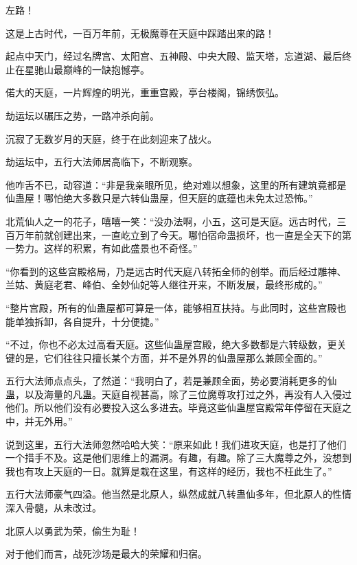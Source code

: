
\begin{this_body}

左路！

这是上古时代，一百万年前，无极魔尊在天庭中踩踏出来的路！

起点中天门，经过名牌宫、太阳宫、五神殿、中央大殿、监天塔，忘道湖、最后终止在星驰山最巅峰的一缺抱憾亭。

偌大的天庭，一片辉煌的明光，重重宫殿，亭台楼阁，锦绣恢弘。

劫运坛以碾压之势，一路冲杀向前。

沉寂了无数岁月的天庭，终于在此刻迎来了战火。

劫运坛中，五行大法师居高临下，不断观察。

他咋舌不已，动容道：“非是我亲眼所见，绝对难以想象，这里的所有建筑竟都是仙蛊屋！哪怕绝大多数只是六转仙蛊屋，但天庭的底蕴也未免太过恐怖。”

北荒仙人之一的花子，嘻嘻一笑：“没办法啊，小五，这可是天庭。远古时代，三百万年前就创建出来，一直屹立到了今天。哪怕宿命蛊损坏，也一直是全天下的第一势力。这样的积累，有如此盛景也不奇怪。”

“你看到的这些宫殿格局，乃是远古时代天庭八转拓全师的创举。而后经过雕神、兰姑、黄庭老君、峰伯、全妙仙妃等人继往开来，不断发展，最终形成的。”

“整片宫殿，所有的仙蛊屋都可算是一体，能够相互扶持。与此同时，这些宫殿也能单独拆卸，各自提升，十分便捷。”

“不过，你也不必太过高看天庭。这些仙蛊屋宫殿，绝大多数都是六转级数，更关键的是，它们往往只擅长某个方面，并不是外界的仙蛊屋那么兼顾全面的。”

五行大法师点点头，了然道：“我明白了，若是兼顾全面，势必要消耗更多的仙蛊，以及海量的凡蛊。天庭自视甚高，除了三位魔尊攻打过之外，再没有人入侵过他们。所以他们没有必要投入这么多进去。毕竟这些仙蛊屋宫殿常年停留在天庭之中，并无外用。”

说到这里，五行大法师忽然哈哈大笑：“原来如此！我们进攻天庭，也是打了他们一个措手不及。这是他们思维上的漏洞。有趣，有趣。除了三大魔尊之外，没想到我也有攻上天庭的一日。就算是栽在这里，有这样的经历，我也不枉此生了。”

五行大法师豪气四溢。他当然是北原人，纵然成就八转蛊仙多年，但北原人的性情深入骨髓，从未改过。

北原人以勇武为荣，偷生为耻！

对于他们而言，战死沙场是最大的荣耀和归宿。


\end{this_body}
